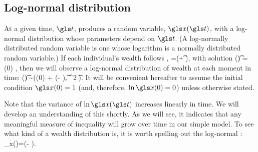 
\subsection{Log-normal distribution}
At a given time, $\t$, \GBM produces a random variable, $\x(\t)$, with a log-normal distribution whose parameters depend on $\t$. (A log-normally distributed random variable is one whose logarithm is a normally distributed random variable.) If each individual's wealth follows \GBM,
\be
\gd\x=\x(\gmu \gd\t + \gsigma \gd\gW),
\ee
with solution 
\be
\x(\t) = \x(0) \exp{},
\ee
then we will observe a log-normal distribution of wealth at each moment in time:
\be
\ln \x(\t) \sim \mathcal{\N}\left(\ln \x(0) + \left(\gmu - \right)\t, \gsigma^2 \t\right).
\ee
It will be convenient hereafter to assume the initial condition $\x(0)=1$ (and, therefore, $\ln \x(0)=0$) unless otherwise stated.

Note that the variance of $\ln \x(\t)$ increases linearly in time. We will develop an understanding of this shortly. As we will see, it indicates that any meaningful measure of inequality will grow over time in our simple model. To see what kind of a wealth distribution  is, it is worth spelling out the log-normal \PDFa:
\be
\PDF_x(\x)=\exp\left(- \right).
\ee

